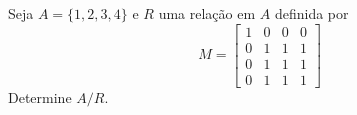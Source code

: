\item %
		Seja $A=\{1,2,3,4\}$ e $R$ uma relação em $A$ definida por
\[ 
M=\begin{bmatrix}
1 & 0 & 0 & 0 \\
0 & 1 & 1 & 1 \\
0 & 1 & 1 & 1 \\
0 & 1 & 1 & 1 
\end{bmatrix}
\]
Determine $A/R$.
